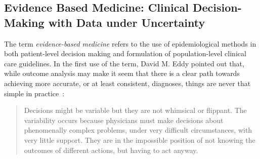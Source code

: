 \documentclass{sigchi}
\begin{document}



\subsection{Evidence Based Medicine: Clinical Decision-Making with Data under Uncertainty} 

The term \emph{evidence-based medicine} refers to the use of epidemiological methods in both patient-level decision making and formulation of population-level clinical care guidelines.  In the first use of the term, David M. Eddy pointed out that, while outcome analysis may make it seem that there is a clear path towards achieving more accurate, or at least consistent, diagnoses, things are never that simple in practice~\cite{eddy1990challenge}:

\begin{quote}
  Decisions might be variable but they are not whimsical or flippant. The variability occurs because physicians must make decisions about phenomenally complex problems, under very difficult circumstances, with very little support. They are in the impossible position of not knowing the outcomes of different actions, but having to act anyway.
\end{quote}
\end{document}
